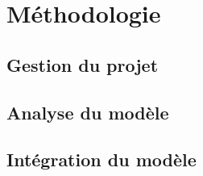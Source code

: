 \section{Méthodologie} %
\label{sec:Méthodologie}

\subsection{Gestion du projet} %
\label{sub:Gestion du projet}

\subsection{Analyse du modèle} %
\label{sub:Analyse du modèle}

\subsection{Intégration du modèle} %
\label{sub:Intégration du modèle}

